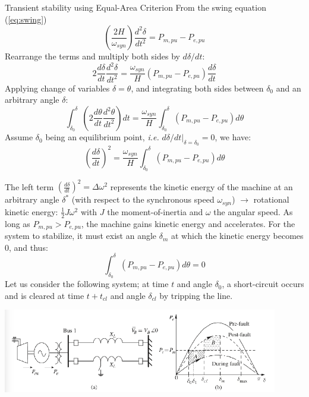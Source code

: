 \begin{frame}[allowframebreaks]{Transient stability using Equal-Area Criterion}
From the swing equation (\ref{eq:swing})
$$\left(\frac{2H}{\omega_{syn}}\right) \frac{d^2\delta}{dt^2} = P_{m,pu} - P_{e,pu}$$
Rearrange the terms and multiply both sides by $d\delta/dt$:
$$2\frac{d\delta}{dt}\frac{d^2\delta}{dt^2} = \frac{\omega_{syn}}{H}\left(P_{m,pu}-P_{e,pu}\right)\frac{d\delta}{dt}$$
Applying change of variables $\delta = \theta$, and integrating both sides between $\delta_0$ and an arbitrary angle $\delta$:
$$\int_{\delta_0}^{\delta} \left(2\frac{d\theta}{dt}\frac{d^2\theta}{dt^2}\right) dt = \frac{\omega_{syn}}{H}\int_{\delta_0}^{\delta} \left(P_{m,pu}-P_{e,pu}\right)d\theta$$
Assume $\delta_0$ being an equilibrium point, \emph{i.e.} $d\delta/dt|_{\delta = \delta_0} = 0$, we have:
$$\left(\frac{d\delta}{dt}\right)^2 = \frac{\omega_{syn}}{H}\int_{\delta_0}^{\delta} \left(P_{m,pu}-P_{e,pu}\right) d\theta$$


The left term $\left(\frac{d\delta}{dt}\right)^2 = \Delta\omega^2$ represents the kinetic energy of the machine at an arbitrary angle $\delta^*$ (with respect to the synchronous speed $\omega_{syn}$) $\rightarrow$ rotational kinetic energy: $\frac{1}{2} J \omega^2$ with $J$ the moment-of-inertia and $\omega$ the angular speed.
As long as $P_{m,pu} > P_{e,pu}$, the machine gains kinetic energy and accelerates. For the system to stabilize, it must exist an angle $\delta_{m}$ at which the kinetic energy becomes 0, and thus:
$$\int_{\delta_0}^{\delta} \left(P_{m,pu}-P_{e,pu}\right) d\theta = 0$$
Let us consider the following system; at time $t$ and angle $\delta_0$, a short-circuit occurs and is cleared at time $t+t_{cl}$ and angle $\delta_{cl}$ by tripping the line.
\begin{center}
\includegraphics[width=0.9\textwidth]{images/TransientStabilityEAC.png}
\end{center}


\end{frame}
